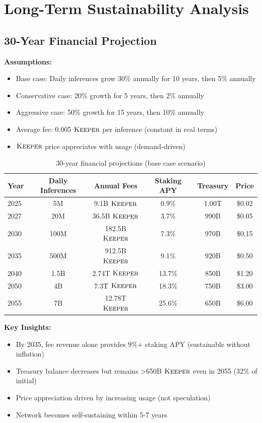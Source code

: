 \section{Long-Term Sustainability Analysis}


\subsection{30-Year Financial Projection}

\textbf{Assumptions:}
\begin{itemize}
\item Base case: Daily inferences grow 30\% annually for 10 years, then 5\% annually
\item Conservative case: 20\% growth for 5 years, then 2\% annually
\item Aggressive case: 50\% growth for 15 years, then 10\% annually
\item Average fee: 0.005 $\textsc{Keeper}$ per inference (constant in real terms)
\item $\textsc{Keeper}$ price appreciates with usage (demand-driven)
\end{itemize}

\begin{table}[h]
\centering
\small
\begin{tabular}{lccccc}
\toprule
\textbf{Year} & \textbf{Daily Inferences} & \textbf{Annual Fees} & \textbf{Staking APY} & \textbf{Treasury} & \textbf{Price} \\
\midrule
2025 & 5M & 9.1B $\textsc{Keeper}$ & 0.9\% & 1.00T & \$0.02 \\
2027 & 20M & 36.5B $\textsc{Keeper}$ & 3.7\% & 990B & \$0.05 \\
2030 & 100M & 182.5B $\textsc{Keeper}$ & 7.3\% & 970B & \$0.15 \\
2035 & 500M & 912.5B $\textsc{Keeper}$ & 9.1\% & 920B & \$0.50 \\
2040 & 1.5B & 2.74T $\textsc{Keeper}$ & 13.7\% & 850B & \$1.20 \\
2050 & 4B & 7.3T $\textsc{Keeper}$ & 18.3\% & 750B & \$3.00 \\
2055 & 7B & 12.78T $\textsc{Keeper}$ & 25.6\% & 650B & \$6.00 \\
\bottomrule
\end{tabular}
\caption{30-year financial projections (base case scenario)}
\label{tab:projections}
\end{table}

\textbf{Key Insights:}
\begin{itemize}
\item By 2035, fee revenue alone provides 9\%+ staking APY (sustainable without inflation)
\item Treasury balance decreases but remains >650B $\textsc{Keeper}$ even in 2055 (32\% of initial)
\item Price appreciation driven by increasing usage (not speculation)
\item Network becomes self-sustaining within 5-7 years
\end{itemize}


